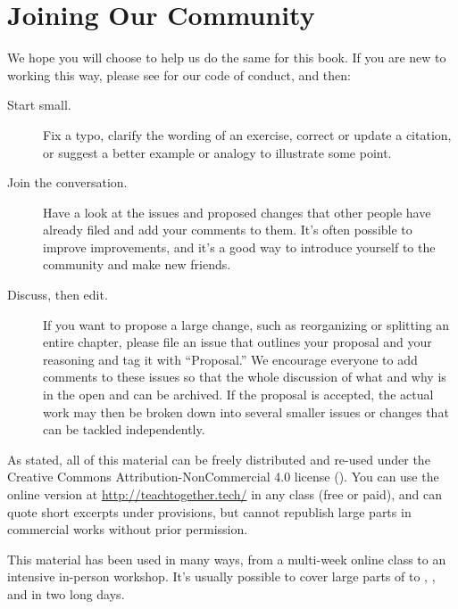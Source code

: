 \chapter{Joining Our Community}\label{s:joining}

We hope you will choose to help us do the same for this book.
If you are new to working this way,
please see  for our code of conduct,
and then:

\begin{description}

\item[Start small.]
  Fix a typo,
  clarify the wording of an exercise,
  correct or update a citation,
  or suggest a better example or analogy to illustrate some point.

\item[Join the conversation.]
  Have a look at the issues and proposed changes that other people have already filed
  and add your comments to them.
  It's often possible to improve improvements,
  and it's a good way to introduce yourself to the community and make new friends.

\item[Discuss, then edit.]
  If you want to propose a large change,
  such as reorganizing or splitting an entire chapter,
  please file an issue that outlines your proposal and your reasoning and tag it with ``Proposal.''
  We encourage everyone to add comments to these issues
  so that the whole discussion of what and why is in the open and can be archived.
  If the proposal is accepted,
  the actual work may then be broken down into several smaller issues or changes
  that can be tackled independently.

\end{description}


As  stated,
all of this material can be freely distributed and re-used
under the Creative Commons Attribution-NonCommercial 4.0 license
().
You can use the online version at \url{http://teachtogether.tech/} in any class (free or paid),
and can quote short excerpts under  provisions,
but cannot republish large parts in commercial works without prior permission.

This material has been used in many ways,
from a multi-week online class to an intensive in-person workshop.
It's usually possible to cover large parts of  to ,
,
and  in two long days.

